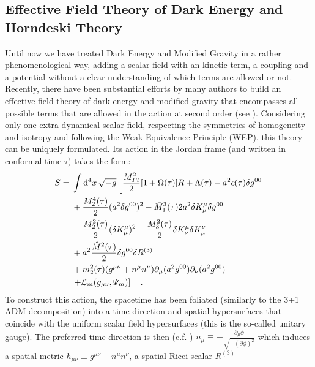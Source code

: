 \subsection{Effective Field Theory of Dark Energy and Horndeski Theory \label{sub:EFT-of-DE}}

Until now we have treated Dark Energy and Modified Gravity in a rather phenomenological way,
adding a scalar field with an kinetic term, a coupling and a potential without a clear understanding
of which terms are allowed or not.
Recently, there have been substantial efforts by many authors to build an effective field theory 
of dark energy and modified gravity that encompasses all possible terms that are allowed 
in the action at second order (see \cite{Gubitosi2013, Gleyzes2016, bloomfield_dark_2013}). Considering only one extra dynamical
scalar field, respecting the symmetries of homogeneity and isotropy and following the Weak Equivalence Principle (WEP),
this theory can be uniquely formulated. Its action in the Jordan frame (and written in conformal time $\tau$) takes the form:
\begin{align}\label{eq:EFT-action}
\begin{split}
S ={}& \int \mathrm{d}^{4} {x} \, \sqrt{-g} \left[ \frac{M_{Pl}^2}{2} [1 + \Omega(\tau)] R + \Lambda(\tau) -a^2 c(\tau)\delta g^{00} \right. \\
     & + \frac{M_{2}^4 (\tau)}{2}(a^2 \delta g^{00})^2 -\bar{M}_{1}^3 (\tau) 2 a^2 \delta K^\mu_\mu \delta g^{00} \\
     & - \frac{\bar{M}_2^2 (\tau)}{2} (\delta K_\mu^\mu )^2 - \frac{\bar{M}_3^2 (\tau)}{2}\delta K^{\mu}_{\nu}\delta K^{\nu}_{\mu} \\
     & + a^2 \frac{\hat{M}^2 (\tau)}{2} \delta g^{00} \delta R^{(3)} \\
     & + m^2_2(\tau) (g^{\mu \nu} + n^\mu n^\nu) \partial_{\mu} (a^2 g^{00})\partial_{\nu} (a^2 g^{00}) \\
     & \left. + \mathcal{L}_m(g_{\mu \nu}, \varPsi_m) \right] \quad.
\end{split}
\end{align}
To construct this action, the spacetime has been foliated (similarly to the 3+1 ADM decomposition) into a time direction
and spatial hypersurfaces that coincide with the uniform scalar field hypersurfaces (this is the so-called unitary gauge). 
The preferred time direction is then (c.f. \cite{Gubitosi2013})
\beeqc$
n_\mu \equiv -\frac{\partial_{\mu}\phi}{\sqrt{-(\partial \phi)^2}}
$
which induces a spatial metric $h_{\mu \nu} \equiv g^{\mu \nu} + n^\mu n^\nu $, a spatial Ricci scalar $R^{(3)}$

